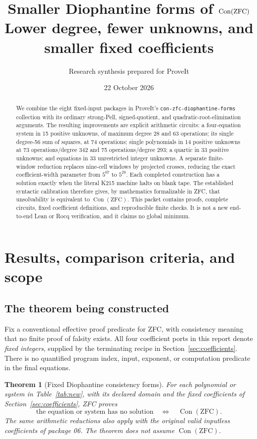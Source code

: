 \documentclass[11pt,a4paper]{article}
\title{\textbf{Smaller Diophantine forms of \(\Con(\mathrm{ZFC})\)}\\[5pt]
\large Lower degree, fewer unknowns, and smaller fixed coefficients}
\author{Research synthesis prepared for ProveIt}
\date{22 October 2026}
\newtheorem{theorem}{Theorem}[section]
\theoremstyle{remark}\newtheorem{remark}[theorem]{Remark}
\newcommand{\Con}{\operatorname{Con}}
\begin{document}
\maketitle
\begin{abstract}
We combine the eight fixed-input packages in ProveIt's
\texttt{con-zfc-diophantine-forms} collection with its ordinary strong-Pell,
signed-quotient, and quadratic-root-elimination arguments. The resulting
improvements are explicit arithmetic circuits: a four-equation system in
15 positive unknowns, of maximum degree 28 and 63 operations; its single
degree-56 sum of squares, at 74 operations; single polynomials in 14 positive
unknowns at 73 operations/degree 342 and 75 operations/degree 293; a quartic
in 33 positive unknowns; and equations in 33 unrestricted integer unknowns.
A separate finite-window reduction replaces nine-cell windows by projected
crosses, reducing the exact coefficient-width parameter from \(5^{67}\) to
\(5^{28}\). Each completed construction has a solution exactly when the
literal K215 machine halts on blank tape. The established syntactic
calibration therefore gives, by mathematics formalizable in ZFC, that
unsolvability is equivalent to \(\Con(\mathrm{ZFC})\). This packet contains
proofs, complete circuits, fixed coefficient definitions, and reproducible
finite checks. It is not a new end-to-end Lean or Rocq verification, and it
claims no global minimum.
\end{abstract}
\tableofcontents
\newpage

\section{Results, comparison criteria, and scope}

\subsection{The theorem being constructed}

Fix a conventional effective proof predicate for ZFC, with consistency
meaning that no finite proof of falsity exists. All four coefficient ports
in this report denote \emph{fixed integers}, supplied by the terminating
recipe in Section~\ref{sec:coefficients}. There is no quantified program
index, input, exponent, or computation predicate in the final equations.

\begin{theorem}[Fixed Diophantine consistency forms]\label{thm:main}
For each polynomial or system in Table~\ref{tab:new}, with its declared
domain and the fixed coefficients of Section~\ref{sec:coefficients}, ZFC
proves
\[
 \text{the equation or system has no solution}
 \quad\Longleftrightarrow\quad \Con(\mathrm{ZFC}).
\]
The same arithmetic reductions also apply with the original valid
inputless coefficients of package 06. The theorem does not assume
\(\Con(\mathrm{ZFC})\).
\end{theorem}
\end{document}

